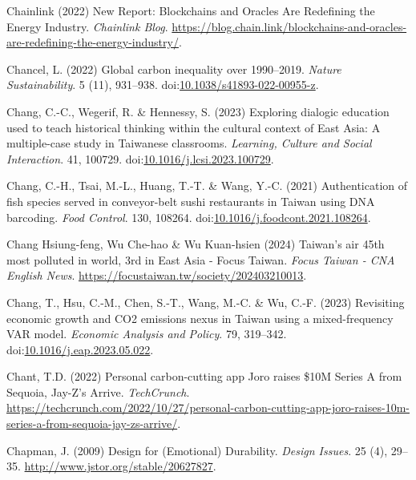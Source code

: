 \documentclass[
  letterpaper,
  DIV=11,
  numbers=noendperiod]{scrartcl}
\newlength{\cslhangindent}
\newenvironment{CSLReferences}[2] %
 {\begin{list}{}{%
  \setlength{\itemindent}{0pt}
  \setlength{\leftmargin}{0pt}
  \setlength{\parsep}{0pt}
  \ifodd #1
   \setlength{\leftmargin}{\cslhangindent}
   \setlength{\itemindent}{-1\cslhangindent}
  \fi
  \setlength{\itemsep}{#2\baselineskip}}}
 {\end{list}}
\begin{document}
\begin{CSLReferences}{0}{1}
Chainlink (2022) New {Report}: {Blockchains} and {Oracles Are
Redefining} the {Energy Industry}. \emph{Chainlink Blog}.
\url{https://blog.chain.link/blockchains-and-oracles-are-redefining-the-energy-industry/}.

Chancel, L. (2022) Global carbon inequality over 1990--2019.
\emph{Nature Sustainability}. 5 (11), 931--938.
doi:\href{https://doi.org/10.1038/s41893-022-00955-z}{10.1038/s41893-022-00955-z}.

Chang, C.-C., Wegerif, R. \& Hennessy, S. (2023) Exploring dialogic
education used to teach historical thinking within the cultural context
of {East Asia}: {A} multiple-case study in {Taiwanese} classrooms.
\emph{Learning, Culture and Social Interaction}. 41, 100729.
doi:\href{https://doi.org/10.1016/j.lcsi.2023.100729}{10.1016/j.lcsi.2023.100729}.

Chang, C.-H., Tsai, M.-L., Huang, T.-T. \& Wang, Y.-C. (2021)
Authentication of fish species served in conveyor-belt sushi restaurants
in {Taiwan} using {DNA} barcoding. \emph{Food Control}. 130, 108264.
doi:\href{https://doi.org/10.1016/j.foodcont.2021.108264}{10.1016/j.foodcont.2021.108264}.

Chang Hsiung-feng, Wu Che-hao \& Wu Kuan-hsien (2024) Taiwan's air 45th
most polluted in world, 3rd in {East Asia} - {Focus Taiwan}. \emph{Focus
Taiwan - CNA English News}.
\url{https://focustaiwan.tw/society/202403210013}.

Chang, T., Hsu, C.-M., Chen, S.-T., Wang, M.-C. \& Wu, C.-F. (2023)
Revisiting economic growth and {CO2} emissions nexus in {Taiwan} using a
mixed-frequency {VAR} model. \emph{Economic Analysis and Policy}. 79,
319--342.
doi:\href{https://doi.org/10.1016/j.eap.2023.05.022}{10.1016/j.eap.2023.05.022}.

Chant, T.D. (2022) Personal carbon-cutting app {Joro} raises \${10M
Series A} from {Sequoia}, {Jay-Z}'s {Arrive}. \emph{TechCrunch}.
\url{https://techcrunch.com/2022/10/27/personal-carbon-cutting-app-joro-raises-10m-series-a-from-sequoia-jay-zs-arrive/}.

Chapman, J. (2009) Design for ({Emotional}) {Durability}. \emph{Design
Issues}. 25 (4), 29--35. \url{http://www.jstor.org/stable/20627827}.


\end{CSLReferences}
\end{document}
